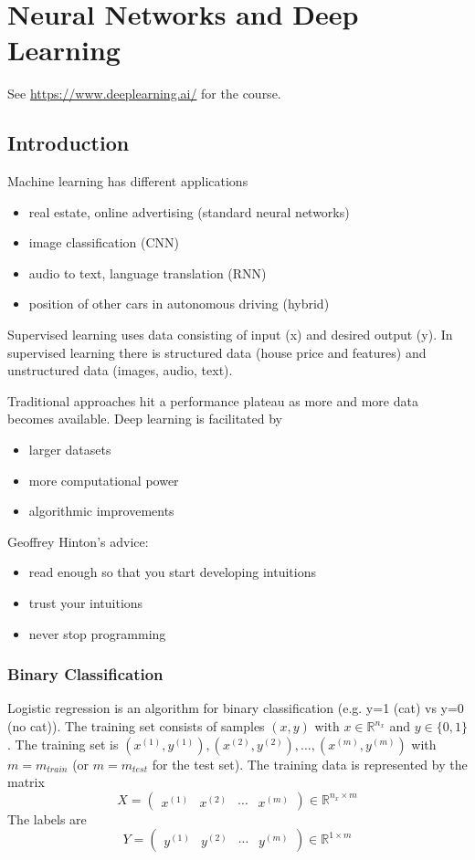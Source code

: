\documentclass{article}
\begin{document}
\section{Neural Networks and Deep Learning}
See \url{https://www.deeplearning.ai/} for the course.
\subsection{Introduction}
Machine learning has different applications
\begin{itemize}
\item real estate, online advertising (standard neural networks)
\item image classification (CNN)
\item audio to text, language translation (RNN)
\item position of other cars in autonomous driving (hybrid)
\end{itemize}

Supervised learning uses data consisting of input (x) and desired output (y).
In supervised learning there is structured data (house price and features)
and unstructured data (images, audio, text).

Traditional approaches hit a performance plateau as more and more data becomes available.
Deep learning is facilitated by
\begin{itemize}
\item larger datasets
\item more computational power
\item algorithmic improvements
\end{itemize}

Geoffrey Hinton's advice:
\begin{itemize}
\item read enough so that you start developing intuitions
\item trust your intuitions
\item never stop programming
\end{itemize}

\subsubsection{Binary Classification}
Logistic regression is an algorithm for binary classification (e.g. y=1 (cat) vs y=0 (no cat)).
The training set consists of samples $(x,y)$ with $x\in\mathbb{R}^{n_x}$ and $y\in\{0,1\}$.
The training set is $(x^{(1)},y^{(1)}), (x^{(2)},y^{(2)}), \ldots, (x^{(m)},y^{(m)})$ with $m=m_{train}$ (or $m=m_{test}$ for the test set).
The training data is represented by the matrix
\begin{equation}
  X=\begin{pmatrix}x^{(1)} & x^{(2)} & \cdots & x^{(m)}\end{pmatrix}\in\mathbb{R}^{n_x\times m}
\end{equation}
The labels are
\begin{equation}
  Y=\begin{pmatrix}y^{(1)} & y^{(2)} & \cdots & y^{(m)}\end{pmatrix}\in\mathbb{R}^{1\times m}
\end{equation}
\end{document}
